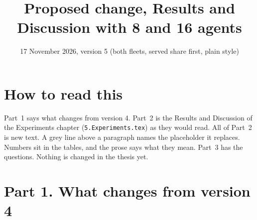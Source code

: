 \documentclass[11pt,a4paper]{article}
\title{Proposed change, Results and Discussion with 8 and 16 agents}
\date{17 November 2026, version 5 (both fleets, served share first, plain style)}
\begin{document}
\maketitle

\section*{How to read this}
Part~1 says what changes from version 4. Part~2 is the Results and Discussion of the Experiments
chapter (\texttt{5.Experiments.tex}) as they would read. All of Part~2 is new text. A grey line
above a paragraph names the placeholder it replaces. Numbers sit in the tables, and the prose says
what they mean. Part~3 has the questions. Nothing is changed in the thesis yet.

\section*{Part 1. What changes from version 4}
\end{document}
